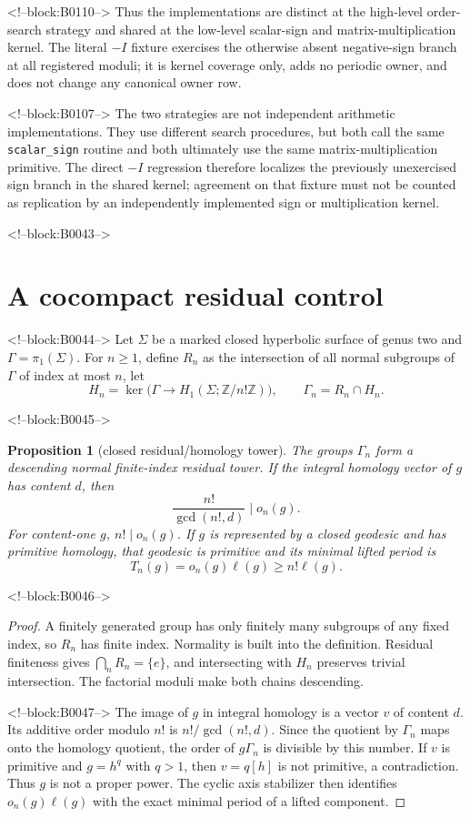 \documentclass[11pt]{article}
\newtheorem{proposition}[theorem]{Proposition}
\theoremstyle{definition}
\theoremstyle{remark}
\newcommand{\ZZ}{\mathbb Z}
\begin{document}
<!--block:B0110-->
Thus the implementations are distinct at the high-level order-search strategy and shared at the low-level scalar-sign and matrix-multiplication kernel. The literal $-I$ fixture exercises the otherwise absent negative-sign branch at all registered moduli; it is kernel coverage only, adds no periodic owner, and does not change any canonical owner row.

<!--block:B0107-->
The two strategies are not independent arithmetic implementations. They use different search procedures, but both call the same \texttt{scalar\_sign} routine and both ultimately use the same matrix-multiplication primitive. The direct $-I$ regression therefore localizes the previously unexercised sign branch in the shared kernel; agreement on that fixture must not be counted as replication by an independently implemented sign or multiplication kernel.

<!--block:B0043-->
\section{A cocompact residual control}

<!--block:B0044-->
Let $\Sigma$ be a marked closed hyperbolic surface of genus two and $\Gamma=\pi_1(\Sigma)$. For $n\geq1$, define $R_n$ as the intersection of all normal subgroups of $\Gamma$ of index at most $n$, let
\[
H_n=\ker\bigl(\Gamma\to H_1(\Sigma;\ZZ/n!\ZZ)\bigr),
\qquad
\Gamma_n=R_n\cap H_n.
\]

<!--block:B0045-->
\begin{proposition}[closed residual/homology tower]\label{prop:closed}
The groups $\Gamma_n$ form a descending normal finite-index residual tower. If the integral homology vector of $g$ has content $d$, then
\[
\frac{n!}{\gcd(n!,d)}\mid o_n(g).
\]
For content-one $g$, $n!\mid o_n(g)$. If $g$ is represented by a closed geodesic and has primitive homology, that geodesic is primitive and its minimal lifted period is
\[
T_n(g)=o_n(g)\ell(g)\geq n!\ell(g).
\]
\end{proposition}

<!--block:B0046-->
\begin{proof}
A finitely generated group has only finitely many subgroups of any fixed index, so $R_n$ has finite index. Normality is built into the definition. Residual finiteness gives $\bigcap_nR_n=\{e\}$, and intersecting with $H_n$ preserves trivial intersection. The factorial moduli make both chains descending.

<!--block:B0047-->
The image of $g$ in integral homology is a vector $v$ of content $d$. Its additive order modulo $n!$ is $n!/\gcd(n!,d)$. Since the quotient by $\Gamma_n$ maps onto the homology quotient, the order of $g\Gamma_n$ is divisible by this number. If $v$ is primitive and $g=h^q$ with $q>1$, then $v=q[h]$ is not primitive, a contradiction. Thus $g$ is not a proper power. The cyclic axis stabilizer then identifies $o_n(g)\ell(g)$ with the exact minimal period of a lifted component.
\end{proof}
\end{document}
